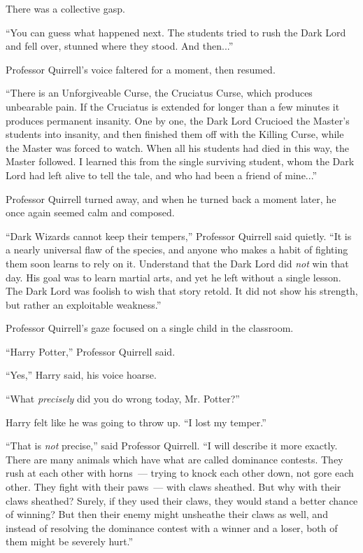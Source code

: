 There was a collective gasp.

``You can guess what happened next. The students tried to rush the Dark Lord and fell over, stunned where they stood. And then...''

Professor Quirrell's voice faltered for a moment, then resumed.

``There is an Unforgiveable Curse, the Cruciatus Curse, which produces unbearable pain. If the Cruciatus is extended for longer than a few minutes it produces permanent insanity. One by one, the Dark Lord Crucioed the Master's students into insanity, and then finished them off with the Killing Curse, while the Master was forced to watch. When all his students had died in this way, the Master followed. I learned this from the single surviving student, whom the Dark Lord had left alive to tell the tale, and who had been a friend of mine...''

Professor Quirrell turned away, and when he turned back a moment later, he once again seemed calm and composed.

``Dark Wizards cannot keep their tempers,'' Professor Quirrell said quietly. ``It is a nearly universal flaw of the species, and anyone who makes a habit of fighting them soon learns to rely on it. Understand that the Dark Lord did \emph{not} win that day. His goal was to learn martial arts, and yet he left without a single lesson. The Dark Lord was foolish to wish that story retold. It did not show his strength, but rather an exploitable weakness.''

Professor Quirrell's gaze focused on a single child in the classroom.

``Harry Potter,'' Professor Quirrell said.

``Yes,'' Harry said, his voice hoarse.

``What \emph{precisely} did you do wrong today, Mr. Potter?''

Harry felt like he was going to throw up. ``I lost my temper.''

``That is \emph{not} precise,'' said Professor Quirrell. ``I will describe it more exactly. There are many animals which have what are called dominance contests. They rush at each other with horns~--- trying to knock each other down, not gore each other. They fight with their paws~--- with claws sheathed. But why with their claws sheathed? Surely, if they used their claws, they would stand a better chance of winning? But then their enemy might unsheathe their claws as well, and instead of resolving the dominance contest with a winner and a loser, both of them might be severely hurt.''

